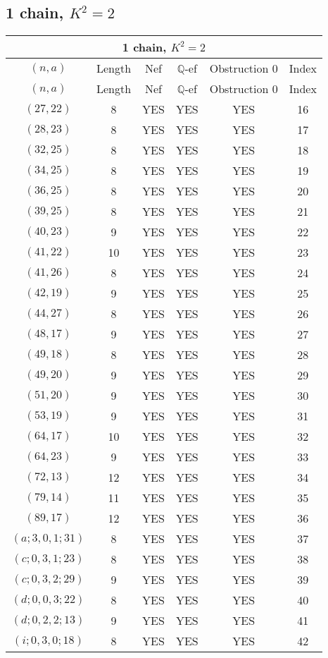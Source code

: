 \subsection{1 chain, $K^2 = 2$}
\begin{longtable}{|c|c|c|c|c|c|}
\hline
\multicolumn{6}{|c|}{1 chain, $K^2 = 2$}\\
\hline
$(n,a)$ & Length & Nef & $\mathbb Q$-ef & Obstruction 0 & Index\\
\hline
\endfirsthead

\hline
$(n,a)$ & Length & Nef & $\mathbb Q$-ef & Obstruction 0 & Index\\
\hline
\endhead
\hline
\endfoot

$(27, 22)$ & 8 & YES & YES & YES & 16\\
$(28, 23)$ & 8 & YES & YES & YES & 17\\
$(32, 25)$ & 8 & YES & YES & YES & 18\\
$(34, 25)$ & 8 & YES & YES & YES & 19\\
$(36, 25)$ & 8 & YES & YES & YES & 20\\
$(39, 25)$ & 8 & YES & YES & YES & 21\\
$(40, 23)$ & 9 & YES & YES & YES & 22\\
$(41, 22)$ & 10 & YES & YES & YES & 23\\
$(41, 26)$ & 8 & YES & YES & YES & 24\\
$(42, 19)$ & 9 & YES & YES & YES & 25\\
$(44, 27)$ & 8 & YES & YES & YES & 26\\
$(48, 17)$ & 9 & YES & YES & YES & 27\\
$(49, 18)$ & 8 & YES & YES & YES & 28\\
$(49, 20)$ & 9 & YES & YES & YES & 29\\
$(51, 20)$ & 9 & YES & YES & YES & 30\\
$(53, 19)$ & 9 & YES & YES & YES & 31\\
$(64, 17)$ & 10 & YES & YES & YES & 32\\
$(64, 23)$ & 9 & YES & YES & YES & 33\\
$(72, 13)$ & 12 & YES & YES & YES & 34\\
$(79, 14)$ & 11 & YES & YES & YES & 35\\
$(89, 17)$ & 12 & YES & YES & YES & 36\\
$(a; 3, 0, 1; 31)$ & 8 & YES & YES & YES & 37\\
$(c; 0, 3, 1; 23)$ & 8 & YES & YES & YES & 38\\
$(c; 0, 3, 2; 29)$ & 9 & YES & YES & YES & 39\\
$(d; 0, 0, 3; 22)$ & 8 & YES & YES & YES & 40\\
$(d; 0, 2, 2; 13)$ & 9 & YES & YES & YES & 41\\
$(i; 0, 3, 0; 18)$ & 8 & YES & YES & YES & 42
\end{longtable}

